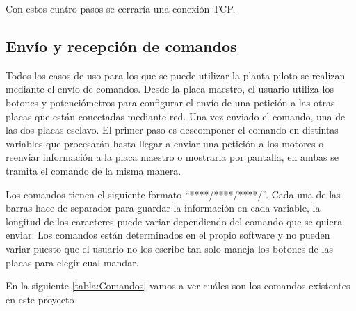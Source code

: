 Con estos cuatro pasos se cerraría una conexión TCP.

\subsection{Envío y recepción de comandos}
Todos los casos de uso para los que se puede utilizar la planta piloto se realizan mediante el envío de comandos. Desde la placa maestro, el usuario utiliza los botones y potenciómetros para configurar el envío de una petición a las otras placas que están conectadas mediante red. Una vez enviado el comando, una de las dos placas esclavo. El primer paso es descomponer el comando en distintas variables que procesarán hasta llegar a enviar una petición a los motores o reenviar información a la placa maestro o mostrarla por pantalla, en ambas se tramita el comando de la misma manera. 

Los comandos tienen el siguiente formato ``****/****/****/''. Cada una de las barras hace de separador para guardar la información en cada variable, la longitud de los caracteres puede variar dependiendo del comando que se quiera enviar. Los comandos están determinados en el propio software y no pueden variar puesto que el usuario no los escribe tan solo maneja los botones de las placas para elegir cual mandar.

En la siguiente \ref{tabla:Comandos} vamos a ver cuáles son los comandos existentes en este proyecto


